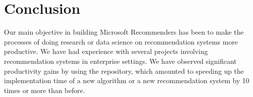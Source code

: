 \section{Conclusion}

Our main objective in building Microsoft Recommenders has been to make the processes of 
doing research or data science on recommendation systems more productive.
We have had experience with several projects involving recommendation systems 
in enterprise settings. We have observed significant productivity gains by using the repository,
which amounted to speeding up the implementation time of a new algorithm or a new recommendation 
system by 10 times or more than before.